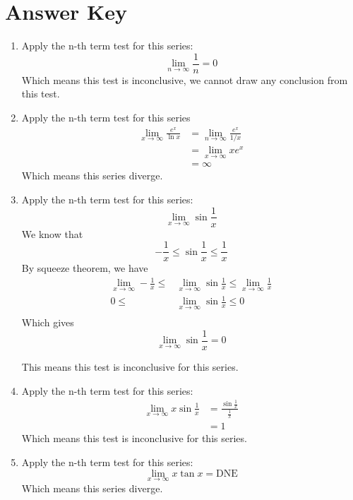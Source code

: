 \documentclass{article}
\numberwithin{equation}{section}
\begin{document}
\section{Answer Key}
\begin{enumerate}
    \item Apply the n-th term test for this series: \[\lim_{n\to\infty}\frac{1}{n} = 0\]
    Which means this test is inconclusive, we cannot draw any conclusion from this test.
    \item Apply the n-th term test for this series
    \begin{align*}
        \lim_{x\to \infty} \frac{e^x}{\ln x} &= \lim_{n\to \infty} \frac{e^x}{1/x}\\
        &= \lim_{x\to \infty} xe^x\\
        &= \infty
    \end{align*}
    Which means this series diverge.
    \item Apply the n-th term test for this series:
    \[\lim_{x\to \infty} \sin \frac{1}{x}\]
    We know that 
    \[
    -\frac{1}{x} \leq \sin \frac{1}{x} \leq \frac{1}{x}
    \]
    By squeeze theorem, we have 
    \begin{align*}
        \lim_{x\to \infty} -\frac{1}{x} \leq &\lim_{x\to \infty}\sin \frac{1}{x} \leq \lim_{x\to \infty} \frac{1}{x}\\
        0 \leq &\lim_{x\to \infty} \sin \frac{1}{x} \leq 0\\
    \end{align*}
    Which gives \[\lim_{x\to \infty} \sin \frac{1}{x} = 0\]

    This means this test is inconclusive for this series.
    \item Apply the n-th term test for this series:
    \begin{align*}
        \lim_{x\to \infty} x\sin \frac{1}{x} &= \frac{\sin \frac{1}{x}}{\frac{1}{x}}\\
        &= 1
    \end{align*}
    Which means this test is inconclusive for this series.
    \item Apply the n-th term test for this series:
    \[\lim_{x\to \infty} x\tan x = \text{DNE}\]
    Which means this series diverge.
\end{enumerate}
\end{document}
